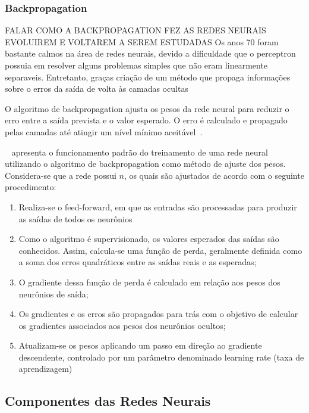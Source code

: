         
        \subsubsection{Backpropagation}
            
            FALAR COMO A BACKPROPAGATION FEZ AS REDES NEURAIS EVOLUIREM E VOLTAREM A SEREM ESTUDADAS
            Os anos 70 foram bastante calmos na área de redes neurais, devido a dificuldade que o perceptron 
            possuia em resolver alguns problemas simples que não eram linearmente separaveis. Entretanto, graças 
            criação de um método que propaga informações sobre o erros da saída de volta às camadas ocultas




            O algoritmo de backpropagation ajusta os pesos da rede neural para reduzir o erro entre a saída prevista 
            e o valor esperado. O erro é calculado e propagado pelas camadas até atingir um nível mínimo aceitável~\cite{marangoni2010}.
            
            ~ apresenta o funcionamento padrão do treinamento de uma rede neural utilizando o algoritmo 
            de backpropagation como método de ajuste dos pesos. Considera-se que a rede possui \( n\),  os quais são 
            ajustados de acordo com o seguinte procedimento:
            \begin{enumerate}
                \item Realiza-se o feed-forward, em que as entradas são processadas para produzir as saídas de todos os neurônios
                \item Como o algoritmo é supervisionado, os valores esperados das saídas são conhecidos. Assim, calcula-se uma função de perda, geralmente definida como a soma dos erros quadráticos entre as saídas reais e as esperadas;
                \item O gradiente dessa função de perda é calculado em relação aos pesos dos neurônios de saída;
                \item Os gradientes e os erros são propagados para trás com o objetivo de calcular os gradientes associados aos pesos dos neurônios ocultos;
                \item Atualizam-se os pesos aplicando um passo em direção ao gradiente descendente, controlado por um parâmetro denominado learning rate (taxa de aprendizagem)
            \end{enumerate}
            
    \subsection{Componentes das Redes Neurais}


